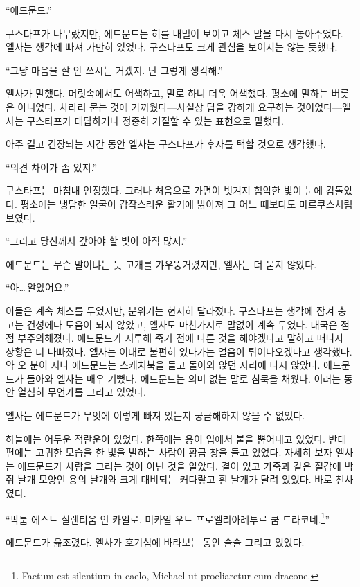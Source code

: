 ``에드문드.''

구스타프가 나무랐지만, 에드문드는 혀를 내밀어 보이고 체스 말을 다시 놓아주었다. 엘사는 생각에 빠져 가만히 있었다. 구스타프도 크게 관심을 보이지는 않는 듯했다.

``그냥 마음을 잘 안 쓰시는 거겠지. 난 그렇게 생각해.''

엘사가 말했다. 머릿속에서도 어색하고, 말로 하니 더욱 어색했다. 평소에 말하는 버릇은 아니었다. 차라리 묻는 것에 가까웠다—사실상 답을 강하게 요구하는 것이었다—엘사는 구스타프가 대답하거나 정중히 거절할 수 있는 표현으로 말했다.

아주 길고 긴장되는 시간 동안 엘사는 구스타프가 후자를 택할 것으로 생각했다.

``의견 차이가 좀 있지.''

구스타프는 마침내 인정했다. 그러나 처음으로 가면이 벗겨져 험악한 빛이 눈에 감돌았다. 평소에는 냉담한 얼굴이 갑작스러운 활기에 밝아져 그 어느 때보다도 마르쿠스처럼 보였다.

``그리고 당신께서 갚아야 할 빚이 아직 많지.''

에드문드는 무슨 말이냐는 듯 고개를 갸우뚱거렸지만, 엘사는 더 묻지 않았다.

``아\ldots\,알았어요.''

이들은 계속 체스를 두었지만, 분위기는 현저히 달라졌다. 구스타프는 생각에 잠겨 충고는 건성에다 도움이 되지 않았고, 엘사도 마찬가지로 말없이 계속 두었다. 대국은 점점 부주의해졌다. 에드문드가 지루해 죽기 전에 다른 것을 해야겠다고 말하고 떠나자 상황은 더 나빠졌다. 엘사는 이대로 불편히 있다가는 얼음이 튀어나오겠다고 생각했다. 약 오 분이 지나 에드문드는 스케치북을 들고 돌아와 앉던 자리에 다시 앉았다. 에드문드가 돌아와 엘사는 매우 기뻤다. 에드문드는 의미 없는 말로 침묵을 채웠다. 이러는 동안 열심히 무언가를 그리고 있었다.

엘사는 에드문드가 무엇에 이렇게 빠져 있는지 궁금해하지 않을 수 없었다.

하늘에는 어두운 적란운이 있었다. 한쪽에는 용이 입에서 불을 뿜어내고 있었다. 반대편에는 고귀한 모습을 한 빛을 발하는 사람이 황금 창을 들고 있었다. 자세히 보자 엘사는 에드문드가 사람을 그리는 것이 아닌 것을 알았다. 결이 있고 가죽과 같은 질감에 박쥐 날개 모양인 용의 날개와 크게 대비되는 커다랗고 흰 날개가 달려 있었다. 바로 천사였다.

``팍툼 에스트 실렌티움 인 카일로. 미카일 우트 프로엘리아레투르 쿰 드라코네.\footnote{Factum est silentium in caelo, Michael ut proeliaretur cum dracone.}''

에드문드가 읊조렸다. 엘사가 호기심에 바라보는 동안 술술 그리고 있었다.


